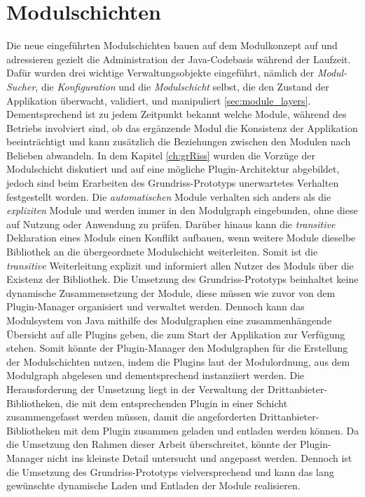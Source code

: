 \section{Modulschichten}
Die neue eingeführten Modulschichten bauen auf dem Modulkonzept auf und adressieren gezielt die Administration der Java-Codebasis während der Laufzeit. Dafür wurden drei wichtige Verwaltungsobjekte eingeführt, nämlich der \textit{Modul-Sucher}, die \textit{Konfiguration} und die \textit{Modulschicht} selbst, die den Zustand der Applikation überwacht, validiert, und manipuliert \ref{sec:module_layers}. Dementsprechend ist zu jedem Zeitpunkt bekannt welche Module, während des Betriebs involviert sind, ob das ergänzende Modul die Konsistenz der Applikation beeinträchtigt und kann zusätzlich die Beziehungen zwischen den Modulen nach Belieben abwandeln. In dem Kapitel \ref{ch:grRiss} wurden die Vorzüge der Modulschicht diskutiert und auf eine mögliche Plugin-Architektur abgebildet, jedoch sind beim Erarbeiten des Grundriss-Prototyps unerwartetes Verhalten festgestellt worden. Die \textit{automatischen} Module verhalten sich anders als die \textit{expliziten} Module und werden immer in den Modulgraph eingebunden, ohne diese auf Nutzung oder Anwendung zu prüfen. Darüber hinaus kann die \textit{transitive} Deklaration eines Moduls einen Konflikt aufbauen, wenn weitere Module dieselbe Bibliothek an die übergeordnete Modulschicht weiterleiten. Somit ist die \textit{transitive} Weiterleitung explizit und informiert allen Nutzer des Moduls über die Existenz der Bibliothek.\newline
Die Umsetzung des Grundriss-Prototyps beinhaltet keine dynamische Zusammensetzung der Module, diese müssen wie zuvor von dem Plugin-Manager organisiert und verwaltet werden. Dennoch kann das Modulsystem von Java mithilfe des Modulgraphen eine zusammenhängende Übersicht auf alle Plugins geben, die zum Start der Applikation zur Verfügung stehen. Somit könnte der Plugin-Manager den Modulgraphen für die Erstellung der Modulschichten nutzen, indem die Plugins laut der Modulordnung, aus dem Modulgraph abgelesen und dementsprechend instanziiert werden. Die Herausforderung der Umsetzung liegt in der Verwaltung der Drittanbieter-Bibliotheken, die mit dem entsprechenden Plugin in einer Schicht zusammengefasst werden müssen, damit die angeforderten Drittanbieter-Bibliotheken mit dem Plugin zusammen geladen und entladen werden können. Da die Umsetzung den Rahmen dieser Arbeit überschreitet, könnte der Plugin-Manager nicht ins kleinste Detail untersucht und angepasst werden. \newline 
Dennoch ist die Umsetzung des Grundriss-Prototyps vielversprechend und kann das lang gewünschte dynamische Laden und Entladen der Module realisieren. \bigbreak

